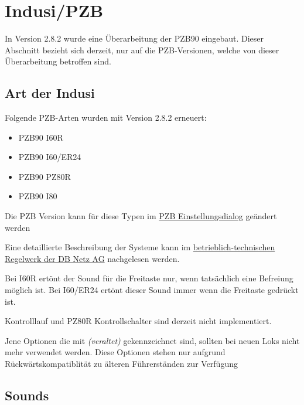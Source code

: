 \section{Indusi/PZB}

In Version 2.8.2 wurde eine Überarbeitung der PZB90 eingebaut. Dieser
Abschnitt bezieht sich derzeit, nur auf die PZB-Versionen, welche von
dieser Überarbeitung betroffen sind.

\subsection{Art der Indusi}

Folgende PZB-Arten wurden mit Version 2.8.2 erneuert:

\begin{itemize}
\itemsep1pt\parskip0pt
\item
  PZB90 I60R
\item
  PZB90 I60/ER24
\item
  PZB90 PZ80R
\item
  PZB90 I80
\end{itemize}

Die PZB Version kann für diese Typen im \hyperref[sec.editor.pzb.einstellungen]{PZB Einstellungsdialog} geändert
werden

Eine detaillierte Beschreibung der Systeme kann im \href{http://www.dbnetze.com/regelwerke}{betrieblich-technischen Regelwerk der DB Netz AG}
nachgelesen werden.

Bei I60R ertönt der Sound für die Freitaste nur, wenn tatsächlich eine
Befreiung möglich ist. Bei I60/ER24 ertönt dieser Sound immer wenn die
Freitaste gedrückt ist.

Kontrolllauf und PZ80R Kontrollschalter sind derzeit nicht implementiert.

Jene Optionen die mit \emph{(veraltet)} gekennzeichnet sind, sollten bei
neuen Loks nicht mehr verwendet werden. Diese Optionen stehen nur
aufgrund Rückwärtskompatiblität zu älteren Führerständen zur Verfügung

\subsection{Sounds}

